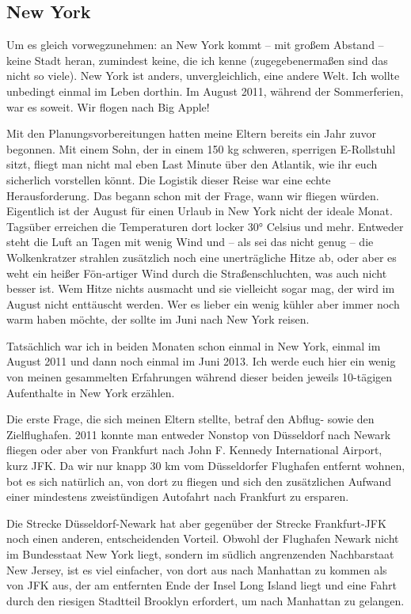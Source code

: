 \documentclass[fontsize=14pt,a4paper,headinclude,DIV=calc,automark]{scrbook}
\begin{document}
\subsection{New York}
\label{sec:new_york}

Um es gleich vorwegzunehmen: an New York kommt – mit großem Abstand – keine Stadt heran, zumindest keine, die ich kenne (zugegebenermaßen sind das nicht so viele). New York ist anders, unvergleichlich, eine andere Welt. Ich wollte unbedingt einmal im Leben dorthin. Im August 2011, während der Sommerferien, war es soweit. Wir flogen nach Big Apple!

Mit den Planungsvorbereitungen hatten meine Eltern bereits ein Jahr zuvor begonnen. Mit einem Sohn, der in einem 150 kg schweren, sperrigen E-Rollstuhl sitzt, fliegt man nicht mal eben Last Minute über den Atlantik, wie ihr euch sicherlich vorstellen könnt. Die Logistik dieser Reise war eine echte Herausforderung. Das begann schon mit der Frage, wann wir fliegen würden. Eigentlich ist der August für einen Urlaub in New York nicht der ideale Monat. Tagsüber erreichen die Temperaturen dort locker 30° Celsius und mehr. Entweder steht die Luft an Tagen mit wenig Wind und – als sei das nicht genug – die Wolkenkratzer strahlen zusätzlich noch eine unerträgliche Hitze ab, oder aber es weht ein heißer Fön-artiger Wind durch die Straßenschluchten, was auch nicht besser ist. Wem Hitze nichts ausmacht und sie vielleicht sogar mag, der wird im August nicht enttäuscht werden. Wer es lieber ein wenig kühler aber immer noch warm haben möchte, der sollte im Juni nach New York reisen.

Tatsächlich war ich in beiden Monaten schon einmal in New York, einmal im August 2011 und dann noch einmal im Juni 2013. Ich werde euch hier ein wenig von meinen gesammelten Erfahrungen während dieser beiden jeweils 10-tägigen Aufenthalte in New York erzählen.

Die erste Frage, die sich meinen Eltern stellte, betraf den Abflug- sowie den Zielflughafen. 2011 konnte man entweder Nonstop von Düsseldorf nach Newark fliegen oder aber von Frankfurt nach John F. Kennedy International Airport, kurz JFK. Da wir nur knapp 30 km vom Düsseldorfer Flughafen entfernt wohnen, bot es sich natürlich an, von dort zu fliegen und sich den zusätzlichen Aufwand einer mindestens zweistündigen Autofahrt nach Frankfurt zu ersparen.

Die Strecke Düsseldorf-Newark hat aber gegenüber der Strecke Frankfurt-JFK noch einen anderen, entscheidenden Vorteil. Obwohl der Flughafen Newark nicht im Bundesstaat New York liegt, sondern im südlich angrenzenden Nachbarstaat New Jersey, ist es viel einfacher, von dort aus nach Manhattan zu kommen als von JFK aus, der am entfernten Ende der Insel Long Island liegt und eine Fahrt durch den riesigen Stadtteil Brooklyn erfordert, um nach Manhattan zu gelangen.
\end{document}
